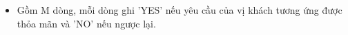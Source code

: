 \begin{itemize}
	\item     Gồm M dòng, mỗi dòng ghi 'YES' nếu yêu cầu của vị khách tương ứng được thỏa mãn và 'NO' nếu ngược lại.   
\end{itemize}